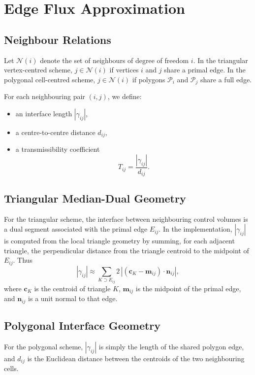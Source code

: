 \documentclass[11pt]{article}
\theoremstyle{plain}
\theoremstyle{definition}
\theoremstyle{remark}
\numberwithin{equation}{section}
\begin{document}
\section{Edge Flux Approximation}
\subsection{Neighbour Relations}
Let $\mathcal{N}(i)$ denote the set of neighbours of degree of freedom $i$. In the triangular vertex-centred scheme, $j \in \mathcal{N}(i)$ if vertices $i$ and $j$ share a primal edge. In the polygonal cell-centred scheme, $j \in \mathcal{N}(i)$ if polygons $\mathcal{P}_i$ and $\mathcal{P}_j$ share a full edge.

For each neighbouring pair $(i,j)$, we define:
\begin{itemize}
\item an interface length $|\gamma_{ij}|$,
\item a centre-to-centre distance $d_{ij}$,
\item a transmissibility coefficient
\begin{equation}
\label{eq:transmissibility}
T_{ij} = \frac{|\gamma_{ij}|}{d_{ij}}.
\end{equation}
\end{itemize}

\subsection{Triangular Median-Dual Geometry}
For the triangular scheme, the interface between neighbouring control volumes is a dual segment associated with the primal edge $E_{ij}$. In the implementation, $|\gamma_{ij}|$ is computed from the local triangle geometry by summing, for each adjacent triangle, the perpendicular distance from the triangle centroid to the midpoint of $E_{ij}$. Thus
\begin{equation}
\label{eq:dual_length}
|\gamma_{ij}| \approx \sum_{K \supset E_{ij}} 2 \, \left| (\bm{c}_K - \bm{m}_{ij}) \cdot \bm{n}_{ij} \right|,
\end{equation}
where $\bm{c}_K$ is the centroid of triangle $K$, $\bm{m}_{ij}$ is the midpoint of the primal edge, and $\bm{n}_{ij}$ is a unit normal to that edge.

\subsection{Polygonal Interface Geometry}
For the polygonal scheme, $|\gamma_{ij}|$ is simply the length of the shared polygon edge, and $d_{ij}$ is the Euclidean distance between the centroids of the two neighbouring cells.
\end{document}
